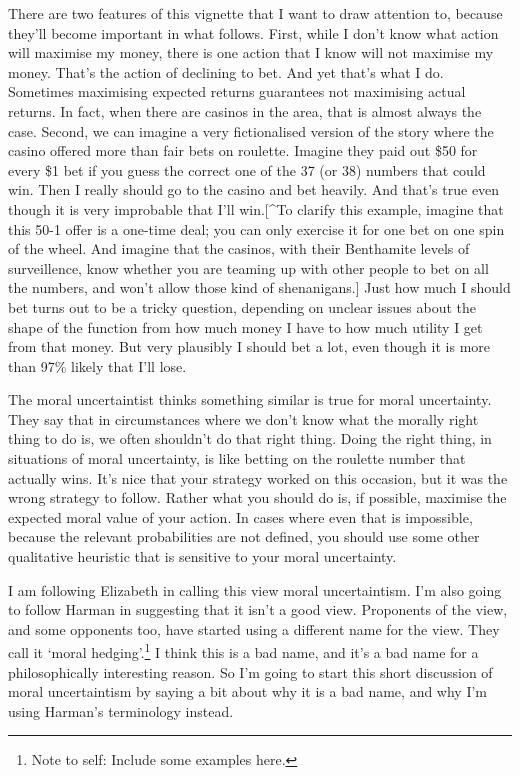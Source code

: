 \documentclass[11pt,]{book}
\let\rmarkdownfootnote\footnote%
\def\footnote{\protect\rmarkdownfootnote}
\begin{document}
There are two features of this vignette that I want to draw attention to, because they'll become important in what follows. First, while I don't know what action will maximise my money, there is one action that I know will not maximise my money. That's the action of declining to bet. And yet that's what I do. Sometimes maximising expected returns guarantees not maximising actual returns. In fact, when there are casinos in the area, that is almost always the case. Second, we can imagine a very fictionalised version of the story where the casino offered more than fair bets on roulette. Imagine they paid out \$50 for every \$1 bet if you guess the correct one of the 37 (or 38) numbers that could win. Then I really should go to the casino and bet heavily. And that's true even though it is very improbable that I'll win.{[}\^{}To clarify this example, imagine that this 50-1 offer is a one-time deal; you can only exercise it for one bet on one spin of the wheel. And imagine that the casinos, with their Benthamite levels of surveillence, know whether you are teaming up with other people to bet on all the numbers, and won't allow those kind of shenanigans.{]} Just how much I should bet turns out to be a tricky question, depending on unclear issues about the shape of the function from how much money I have to how much utility I get from that money. But very plausibly I should bet a lot, even though it is more than 97\% likely that I'll lose.

The moral uncertaintist thinks something similar is true for moral uncertainty. They say that in circumstances where we don't know what the morally right thing to do is, we often shouldn't do that right thing. Doing the right thing, in situations of moral uncertainty, is like betting on the roulette number that actually wins. It's nice that your strategy worked on this occasion, but it was the wrong strategy to follow. Rather what you should do is, if possible, maximise the expected moral value of your action. In cases where even that is impossible, because the relevant probabilities are not defined, you should use some other qualitative heuristic that is sensitive to your moral uncertainty.

I am following Elizabeth \citet{Harman2013} in calling this view moral uncertaintism. I'm also going to follow Harman in suggesting that it isn't a good view. Proponents of the view, and some opponents too, have started using a different name for the view. They call it `moral hedging'.\footnote{Note to self: Include some examples here.} I think this is a bad name, and it's a bad name for a philosophically interesting reason. So I'm going to start this short discussion of moral uncertaintism by saying a bit about why it is a bad name, and why I'm using Harman's terminology instead.
\end{document}
